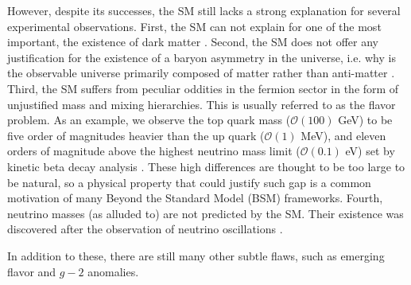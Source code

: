 However, despite its successes, the SM still lacks a strong explanation for several experimental observations. 
%
%
%
First, the SM can not explain for one of the most important, the existence of dark matter \cite{Bergstr_m_2000}. 
%
%
%
Second, the SM does not offer any justification for the existence of a baryon asymmetry in the universe, i.e. why is the observable universe primarily composed of matter rather than anti-matter \cite{book_Baryion}. 
%
%
Third, the SM suffers from peculiar oddities in the fermion sector in the form of unjustified mass and mixing hierarchies. 
%
This is usually referred to as the flavor problem. %
%
As an example, we observe the top quark mass ($\mathcal{O}(100)$ GeV) to be five order of magnitudes heavier than the up quark ($\mathcal{O}(1)$ MeV), and eleven orders of magnitude above the highest neutrino mass limit ($\mathcal{O}(0.1)$ eV) set by kinetic beta decay analysis \cite{Mertens_2016}.
%
%
These high differences are thought to be too large to be natural, so a physical property that could justify such gap is a common motivation of many Beyond the Standard Model (BSM) frameworks. 
%
Fourth, neutrino masses (as alluded to) are not predicted by the SM. 
%
Their existence was discovered after the observation of neutrino oscillations \cite{PhysRevD.89.013001}. 

In addition to these, there are still many other subtle flaws, such as emerging flavor and $g-2$ anomalies. 
%
%

